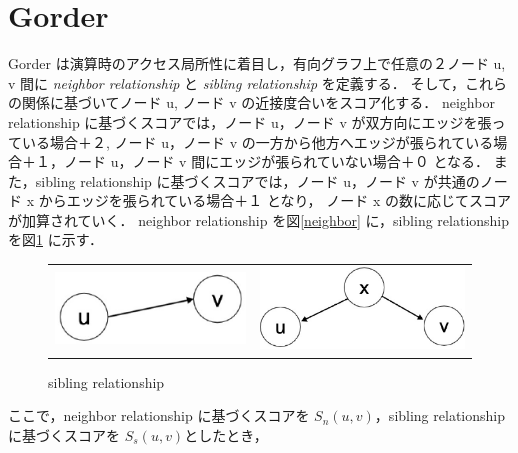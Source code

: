 \section{Gorder}
Gorder\cite{wei2016speedup} は演算時のアクセス局所性に着目し，有向グラフ上で任意の２ノード u, v 間に \textit{neighbor relationship} と \textit{sibling relationship} を定義する．
そして，これらの関係に基づいてノード u, ノード v の近接度合いをスコア化する．
neighbor relationship に基づくスコアでは，ノード u，ノード v が双方向にエッジを張っている場合＋２,
ノード u，ノード v の一方から他方へエッジが張られている場合＋１，ノード u，ノード v 間にエッジが張られていない場合＋０ となる．
また，sibling relationship に基づくスコアでは，ノード u，ノード v が共通のノード x からエッジを張られている場合＋１ となり，
ノード x の数に応じてスコアが加算されていく．
neighbor relationship を図\ref{neighbor} に，sibling relationship を図\ref{sibling} に示す． 
\begin{figure}[t]
  \begin{tabular}{cc}
    \begin{minipage}[t]{0.45\hsize}
      \centering
      \includegraphics[width=6.5cm]{./figure/neighbor.pdf}
      \caption{neighbor relationship}
      \label{neighbor}
    \end{minipage} &
    \begin{minipage}[t]{0.45\hsize}
      \centering
      \includegraphics[width=7cm]{./figure/sibling.pdf}
      \caption{sibling relationship}
      \label{sibling}
    \end{minipage}
  \end{tabular}
\end{figure}
ここで，neighbor relationship に基づくスコアを $S_{n}(u,v)$，sibling relationship に基づくスコアを $S_{s}(u,v)$としたとき，
